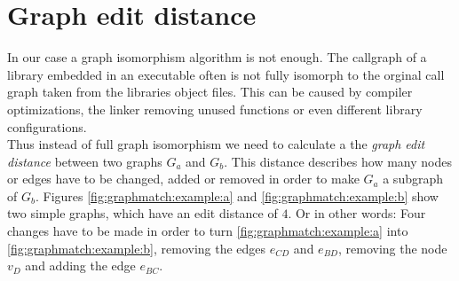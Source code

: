 \documentclass[
    12pt,                               %
    DIV=14,                     %
    parskip=half+,              %
    bigheadings,                %
    cleardoubleempty,   %
    halfparskip,                %
    ]{scrreprt} %
\begin{document}

\section{Graph edit distance} \label{sec:editdistance}
In our case a graph isomorphism algorithm is not enough. The callgraph of a library embedded in an executable often is not fully isomorph to the orginal call graph taken from the libraries object files. This can be caused by compiler optimizations, the linker removing unused functions or even different library configurations. \\
Thus instead of full graph isomorphism we need to calculate a the \textit{graph edit distance} between two graphs $G_a$ and $G_b$. This distance describes how many nodes or edges have to be changed, added or removed in order to make $G_a$ a subgraph of $G_b$. Figures \ref{fig:graphmatch:example:a} and \ref{fig:graphmatch:example:b} show two simple graphs, which have an edit distance of $4$. Or in other words: Four changes have to be made in order to turn \ref{fig:graphmatch:example:a} into \ref{fig:graphmatch:example:b}, removing the edges $e_{CD}$ and $e_{BD}$, removing the node $v_D$ and adding the edge $e_{BC}$. \\

\end{document}
